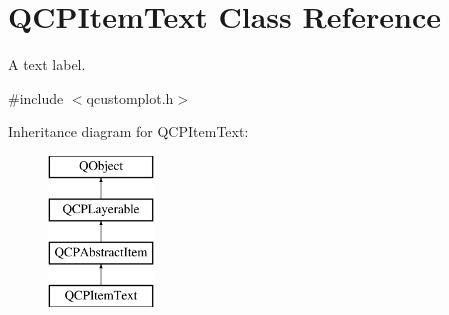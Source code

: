 \hypertarget{class_q_c_p_item_text}{}\section{Q\+C\+P\+Item\+Text Class Reference}
\label{class_q_c_p_item_text}


A text label.  




{\ttfamily \#include $<$qcustomplot.\+h$>$}

Inheritance diagram for Q\+C\+P\+Item\+Text\+:\begin{figure}[H]
\begin{center}
\leavevmode
\includegraphics[height=4.000000cm]{class_q_c_p_item_text}
\end{center}
\end{figure}
